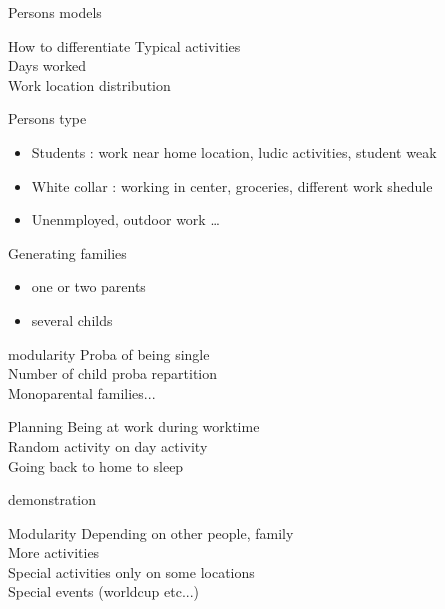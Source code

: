 \begin{frame}{Persons models}
\begin{block}{How to differentiate}
Typical activities\\
Days worked \\
Work location distribution
\end{block}

\begin{alertblock}{Persons type}
\begin{itemize}
\item Students : work near home location, ludic activities, student weak
\item White collar : working in center, groceries, different work shedule
\item Unenmployed, outdoor work \ldots
\end{itemize}

\end{alertblock}

\end{frame}


\begin{frame}{Generating families}
\begin{itemize}
\item one or two parents
\item several childs 
\end{itemize}

\begin{alertblock}{modularity}
Proba of being single\\
Number of child proba repartition\\
Monoparental families...
\end{alertblock}
\end{frame}

\begin{frame}{Planning}
Being at work during worktime\\
Random activity on day activity\\
Going back to home to sleep\\
\begin{block}{demonstration}
\end{block}
\begin{alertblock}{Modularity}
Depending on other people, family\\
More activities\\
Special activities only on some locations\\
Special events (worldcup etc...)
\end{alertblock}
\end{frame}



